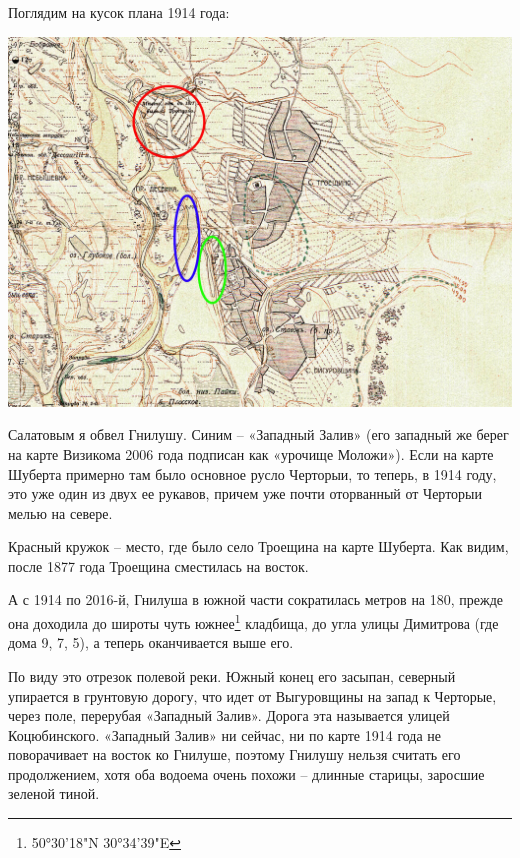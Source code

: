 
Поглядим на кусок плана 1914 года:

\begin{center}
\includegraphics[width=\linewidth]{chast-gorodki/gnilusha/gni1914.jpg}
\end{center}

Салатовым я обвел Гнилушу. Синим – «Западный Залив» (его западный же берег на карте Визикома 2006 года подписан как «урочище Моложи»). Если на карте Шуберта примерно там было основное русло Черторыи, то теперь, в 1914 году, это уже один из двух ее рукавов, причем уже почти оторванный от Черторыи мелью на севере.
 
Красный кружок – место, где было село Троещина на карте Шуберта. Как видим, после 1877 года Троещина сместилась на восток.


А с 1914 по 2016-й, Гнилуша в южной части сократилась метров на 180, прежде она доходила до широты чуть южнее\footnote{50°30'18"N 30°34'39"E} кладбища, до угла улицы Димитрова (где дома 9, 7, 5), а теперь оканчивается выше его.

По виду это отрезок полевой реки. Южный конец его засыпан, северный упирается в грунтовую дорогу, что идет от Выгуровщины на запад к Черторые, через поле, перерубая «Западный Залив». Дорога эта называется улицей Коцюбинского. «Западный Залив» ни сейчас, ни по карте 1914 года не поворачивает на восток ко Гнилуше, поэтому Гнилушу нельзя считать его продолжением, хотя оба водоема очень похожи – длинные старицы, заросшие зеленой тиной. 

